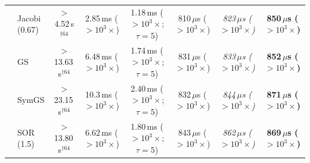 {\begin{tabular}{llcccccc}
 & Jacobi (0.67) & $>$4.52\,s$^{\dagger 64}$ & 2.85\,ms ($>10^{3}\times$) & 1.18\,ms ($>10^{3}\times$; $\tau{=}5$) & 810\,$\mu$s ($>10^{3}\times$) & \textit{823\,$\mu$s ($>10^{3}\times$)} & \textbf{850\,$\mu$s ($>10^{3}\times$)} \\
 & GS & $>$13.63\,s$^{\dagger 64}$ & 6.48\,ms ($>10^{3}\times$) & 1.74\,ms ($>10^{3}\times$; $\tau{=}5$) & 831\,$\mu$s ($>10^{3}\times$) & \textit{833\,$\mu$s ($>10^{3}\times$)} & \textbf{852\,$\mu$s ($>10^{3}\times$)} \\
 & SymGS & $>$23.15\,s$^{\dagger 64}$ & 10.3\,ms ($>10^{3}\times$) & 2.40\,ms ($>10^{3}\times$; $\tau{=}5$) & 832\,$\mu$s ($>10^{3}\times$) & \textit{844\,$\mu$s ($>10^{3}\times$)} & \textbf{871\,$\mu$s ($>10^{3}\times$)} \\
 & SOR (1.5) & $>$13.80\,s$^{\dagger 64}$ & 6.62\,ms ($>10^{3}\times$) & 1.80\,ms ($>10^{3}\times$; $\tau{=}5$) & 843\,$\mu$s ($>10^{3}\times$) & \textit{862\,$\mu$s ($>10^{3}\times$)} & \textbf{869\,$\mu$s ($>10^{3}\times$)} \\
\bottomrule
\end{tabular}}
